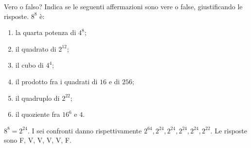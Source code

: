 
\begin{esercizio}
Vero o falso? Indica se le seguenti affermazioni sono vere o false, giustificando le risposte. $8^8$ è:
    \begin{enumerate}
        \item la quarta potenza di $4^8$; 
        \item il quadrato di $2^{12}$; 
        \item il cubo di $4^4$; 
        \item il prodotto fra i quadrati di $16$ e di $256$; 
        \item il quadruplo di $2^{22}$; 
        \item il quoziente fra $16^6$ e $4$. 
    \end{enumerate}
\end{esercizio}

\begin{soluzione}
$8^8=2^{24}$. I sei confronti danno rispettivamente
$2^{64},2^{24},2^{24},2^{24},2^{24},2^{22}$.
Le risposte sono F, V, V, V, V, F.
\end{soluzione}
